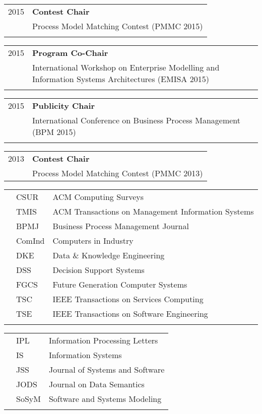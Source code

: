 \begin{tabular}{P{3cm}P{12cm}}
2015	& \textbf{Contest Chair}  \\
			& Process Model Matching Contest (PMMC 2015) \\
& \\		
			\end{tabular}
\begin{tabular}{P{3cm}P{12cm}}
2015	& \textbf{Program Co-Chair} \\
			& International Workshop on Enterprise Modelling and Information Systems Architectures (EMISA 2015)  \\
& \\			
			\end{tabular}
\begin{tabular}{P{3cm}P{12cm}}
2015	& \textbf{Publicity Chair} \\
			& International Conference on Business Process Management (BPM 2015) \\
& \\		
			\end{tabular}
\begin{tabular}{P{3cm}P{12cm}}
2013	& \textbf{Contest Chair} \\
			& Process Model Matching Contest (PMMC 2013) \\
\end{tabular}

\vspace{0.5cm}
\vspace{0.3cm}

\raggedright
\begin{tabular}{P{2.5cm}P{2cm}P{11cm}}
	& CSUR		&	ACM Computing Surveys \\\noalign{\smallskip}
	&TMIS		& ACM Transactions on Management Information Systems \\\noalign{\smallskip}
	&BPMJ		& 	Business Process Management Journal\\\noalign{\smallskip}
	&ComInd	& 	Computers in Industry\\\noalign{\smallskip}
	&DKE		& 	Data \& Knowledge Engineering \\\noalign{\smallskip}
	&DSS		& 	Decision Support Systems\\\noalign{\smallskip}
	&FGCS		& Future Generation Computer Systems\\\noalign{\smallskip}
	&TSC		& IEEE Transactions on Services Computing\\\noalign{\smallskip}
	& TSE		& IEEE Transactions on Software Engineering \\\noalign{\smallskip}
		\end{tabular}
	\begin{tabular}{P{2.5cm}P{2cm}P{11cm}}
	&IPL			& Information Processing Letters\\\noalign{\smallskip}
	&IS			& Information Systems\\\noalign{\smallskip}
	&JSS			& Journal of Systems and Software\\\noalign{\smallskip}
	&JODS		& Journal on Data Semantics\\\noalign{\smallskip}
	&SoSyM	& Software and Systems Modeling\\\noalign{\smallskip}
\end{tabular}

